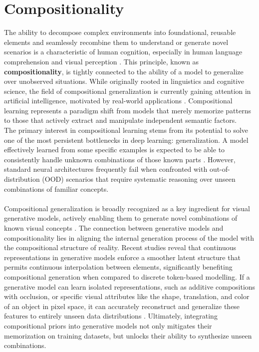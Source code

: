 \chapter{Compositionality}\label{ch:compositionality}

The ability to decompose complex environments into foundational, reusable elements and seamlessly recombine them to understand or generate novel scenarios is a characteristic of human cognition, especially in human language comprehension and visual perception \cite{sinha2024surveycompositionallearningai}. This principle, known as \textbf{compositionality}, is tightly connected to the ability of a model to generalize over unobserved situations. While originally rooted in linguistics and cognitive science, the field of compositional generalization is currently gaining attention in artificial intelligence, motivated by real-world applications \cite{lin2023surveycompositionalgeneralizationapplications}. Compositional learning represents a paradigm shift from models that merely memorize patterns to those that actively extract and manipulate independent semantic factors. \\
The primary interest in compositional learning stems from its potential to solve one of the most persistent bottlenecks in deep learning: generalization. A model effectively learned from some specific examples is expected to be able to consistently handle unknown combinations of those known parts \cite{ram2024makesmodelscompositionaltheoretical}. However, standard neural architectures frequently fail when confronted with out-of-distribution (OOD) scenarios that require systematic reasoning over unseen combinations of familiar concepts. \\
\\
Compositional generalization is broadly recognized as a key ingredient for visual generative models, actively enabling them to generate novel combinations of known visual concepts \cite{farid2026drivescompositionalgeneralizationimportance}. The connection between generative models and compositionality lies in aligning the internal generation process of the model with the compositional structure of reality. Recent studies reveal that continuous representations in generative models enforce a smoother latent structure that permits continuous interpolation between elements, significantly benefiting compositional generation when compared to discrete token-based modelling. If a generative model can learn isolated representations, such as additive compositions with occlusion, or specific visual attributes like the shape, translation, and color of an object in pixel space, it can accurately reconstruct and generalize these features to entirely unseen data distributions \cite{wiedemer2023compositionalgeneralizationprinciples}. Ultimately, integrating compositional priors into generative models not only mitigates their memorization on training datasets, but unlocks their ability to synthesize unseen combinations.


